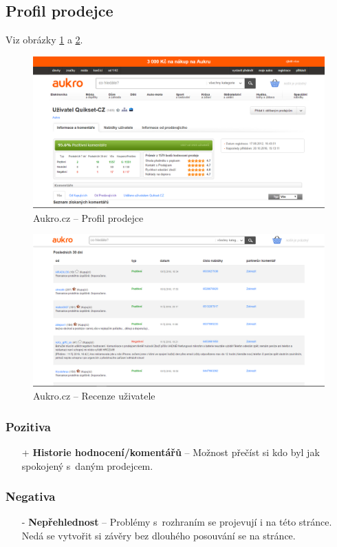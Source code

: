 \subsection{Profil prodejce}
Viz obrázky \ref{fig:aukro:profile} a  \ref{fig:aukro:profile2}.
\begin{figure}[h]
    \centering
    \includegraphics[width=1.0\textwidth]{media/aukro/profile.png}
    \caption{Aukro.cz -- Profil prodejce}
    \label{fig:aukro:profile}
\end{figure}
\begin{figure}[h]
    \centering
    \includegraphics[width=1.0\textwidth]{media/aukro/profile2.png}
    \caption{Aukro.cz -- Recenze uživatele}
    \label{fig:aukro:profile2}
\end{figure}
\subsubsection*{Pozitiva}
\begin{itemize}
    \item[+] \textbf{Historie hodnocení/komentářů} -- Možnost přečíst si kdo byl jak spokojený s~daným prodejcem.
\end{itemize}
\subsubsection*{Negativa}
\begin{itemize}
    \item[-] \textbf{Nepřehlednost} -- Problémy s~rozhraním se projevují i na této stránce. Nedá se vytvořit si závěry bez dlouhého posouvání se na stránce.
\end{itemize}


